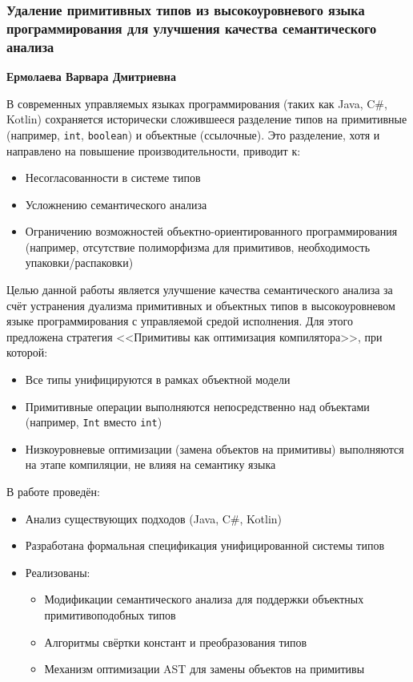 
\begin{center}
\subsubsection*{Удаление примитивных типов из высокоуровневого языка программирования для улучшения качества семантического анализа}
\textbf{Ермолаева Варвара Дмитриевна}
\end{center}

В современных управляемых языках программирования (таких как Java, C\#, Kotlin) сохраняется исторически сложившееся разделение типов на примитивные (например, \texttt{int}, \texttt{boolean}) и объектные (ссылочные). Это разделение, хотя и направлено на повышение производительности, приводит к:

\begin{itemize}[leftmargin=*,label={--}]
    \item Несогласованности в системе типов
    \item Усложнению семантического анализа
    \item Ограничению возможностей объектно-ориентированного программирования (например, отсутствие полиморфизма для примитивов, необходимость упаковки/распаковки)
\end{itemize}

\medskip

Целью данной работы является улучшение качества семантического анализа за счёт устранения дуализма примитивных и объектных типов в высокоуровневом языке программирования с управляемой средой исполнения. Для этого предложена стратегия <<Примитивы как оптимизация компилятора>>, при которой:

\begin{itemize}[leftmargin=*,label={--}]
    \item Все типы унифицируются в рамках объектной модели
    \item Примитивные операции выполняются непосредственно над объектами (например, \texttt{Int} вместо \texttt{int})
    \item Низкоуровневые оптимизации (замена объектов на примитивы) выполняются на этапе компиляции, не влияя на семантику языка
\end{itemize}

\medskip

В работе проведён:

\begin{itemize}[leftmargin=*,label={--}]
    \item Анализ существующих подходов (Java, C\#, Kotlin)
    \item Разработана формальная спецификация унифицированной системы типов
    \item Реализованы:
    \begin{itemize}
        \item Модификации семантического анализа для поддержки объектных примитивоподобных типов
        \item Алгоритмы свёртки констант и преобразования типов
        \item Механизм оптимизации AST для замены объектов на примитивы
    \end{itemize}
\end{itemize}

